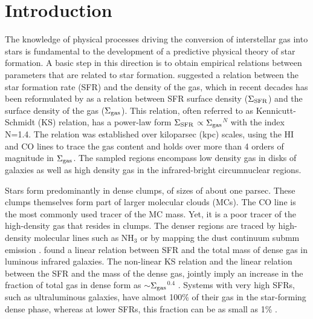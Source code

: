 \documentclass[iop]{emulateapj}
\newcommand{\sigsfr}{$\Sigma_{\rm SFR}$}
\newcommand{\siggas}{$\Sigma_{\rm gas}$}
\begin{document}

\section{Introduction}

The knowledge of physical processes driving the conversion of interstellar 
gas into stars is fundamental to the development of a predictive physical 
theory of star formation. A basic step in this direction is to obtain empirical 
relations between parameters that are related to star formation.
\citet{schmidt59} suggested a relation between the
star formation rate (SFR) and the density of the gas, which in 
recent decades has been reformulated by \citet{kennicutt98} as a relation 
between SFR surface density (\sigsfr) and the surface density of the 
gas (\siggas). This relation, often referred to as Kennicutt-Schmidt (KS) 
relation, has a power-law form \sigsfr$\propto$\siggas$^N$ with the index 
N=1.4. The relation was established over kiloparsec (kpc) scales, 
using the HI and CO lines to trace the gas content and holds over more than 4 
orders of magnitude in \siggas. The sampled regions encompass low density 
gas in disks of galaxies as well as high density gas in the infrared-bright 
circumnuclear regions. 

Stars form predominantly in dense clumps, of sizes of about one parsec.
These clumps themselves form part of larger molecular 
clouds (MCs). The CO line is the most commonly used tracer of the 
MC mass. Yet, it is a poor tracer of the high-density gas that resides in clumps. 
The denser regions are traced by high-density molecular lines such as 
NH$_3$ or by mapping the dust continuum submm emission 
\citep{heyer+16}. \citet{gao+04}
found a linear relation between SFR and the total mass of dense gas in luminous
infrared galaxies. The non-linear KS relation and the linear relation
between the SFR and the mass of the dense gas, jointly imply an increase
in the fraction of total gas in dense form as $\sim$\siggas$^{0.4}$
\citep{heiderman+10}. Systems with very high SFRs, such as ultraluminous
galaxies, have almost 100\% of their gas in the star-forming dense phase, whereas at lower
SFRs, this fraction can be as small as 1\% \citep{kennicutt+12}.
\end{document}

